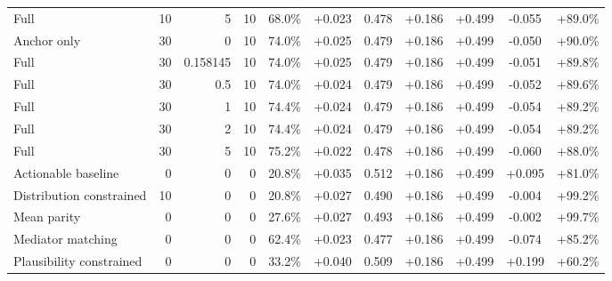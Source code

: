 \begin{table}[htbp]
\begin{tabular}{lrrrccccccc}
Full & 10 & 5 & 10 & 68.0\% & +0.023 & 0.478 & +0.186 & +0.499 & -0.055 & +89.0\% \\
Anchor only & 30 & 0 & 10 & 74.0\% & +0.025 & 0.479 & +0.186 & +0.499 & -0.050 & +90.0\% \\
Full & 30 & 0.158145 & 10 & 74.0\% & +0.025 & 0.479 & +0.186 & +0.499 & -0.051 & +89.8\% \\
Full & 30 & 0.5 & 10 & 74.0\% & +0.024 & 0.479 & +0.186 & +0.499 & -0.052 & +89.6\% \\
Full & 30 & 1 & 10 & 74.4\% & +0.024 & 0.479 & +0.186 & +0.499 & -0.054 & +89.2\% \\
Full & 30 & 2 & 10 & 74.4\% & +0.024 & 0.479 & +0.186 & +0.499 & -0.054 & +89.2\% \\
Full & 30 & 5 & 10 & 75.2\% & +0.022 & 0.478 & +0.186 & +0.499 & -0.060 & +88.0\% \\
Actionable baseline & 0 & 0 & 0 & 20.8\% & +0.035 & 0.512 & +0.186 & +0.499 & +0.095 & +81.0\% \\
Distribution constrained & 10 & 0 & 0 & 20.8\% & +0.027 & 0.490 & +0.186 & +0.499 & -0.004 & +99.2\% \\
Mean parity & 0 & 0 & 0 & 27.6\% & +0.027 & 0.493 & +0.186 & +0.499 & -0.002 & +99.7\% \\
Mediator matching & 0 & 0 & 0 & 62.4\% & +0.023 & 0.477 & +0.186 & +0.499 & -0.074 & +85.2\% \\
Plausibility constrained & 0 & 0 & 0 & 33.2\% & +0.040 & 0.509 & +0.186 & +0.499 & +0.199 & +60.2\% \\
\bottomrule
\end{tabular}
\end{table}